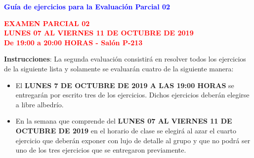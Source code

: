 \documentclass[12pt]{report}
\numberwithin{section}{chapter}
\begin{document}
\begin{center}
\textcolor{blue}{\textbf{\large Guía de ejercicios para la Evaluación Parcial 02 }}
\end{center}

\begin{center}
\textcolor{red}{\textbf{\large EXAMEN PARCIAL 02\\
LUNES 07 AL VIERNES 11 DE OCTUBRE DE 2019\\
De 19:00 a 20:00 HORAS - Salón P-213}}
\vspace{0.5 cm}
\end{center}

\textbf{Instrucciones}: La segunda evaluación consistirá en resolver todos los ejercicios de la siguiente lista y solamente se evaluarán cuatro de la siguiente manera:
\begin{itemize}
\item El \textbf{LUNES 7 DE OCTUBRE DE 2019 A LAS 19:00 HORAS} se entregarán por escrito tres de los ejercicios. Dichos ejercicios deberán elegirse a libre albedrío.
\item En la semana que comprende del \textbf{LUNES 07 AL VIERNES 11 DE OCTUBRE DE 2019} en el horario de clase se elegirá al azar el cuarto ejercicio que deberán exponer con lujo de detalle al grupo y que no podrá ser uno de los tres ejercicios que se entregaron previamente.\\
\end{itemize}
\end{document}
